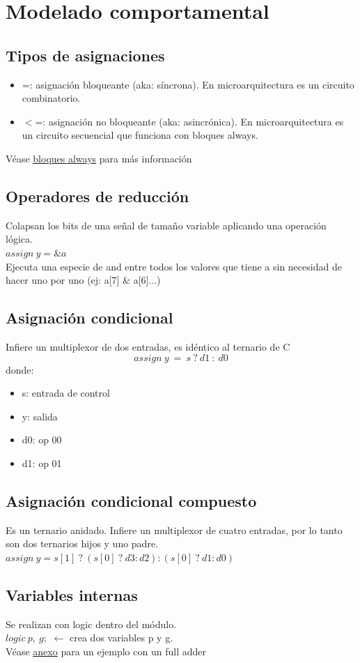 \documentclass[10pt,a4paper]{article}
\begin{document}
\section*{Modelado comportamental}
\subsection*{Tipos de asignaciones}
\begin{itemize}
    \item =: asignación bloqueante (aka: síncrona). En microarquitectura es un circuito combinatorio. 
    \item $<$=: asignación no bloqueante (aka: asincrónica). En microarquitectura es un circuito secuencial que funciona con bloques always. 
\end{itemize}
Véase \hyperref[subsec:bloques_always]{\underline{bloques always}} para más información
\subsection*{Operadores de reducción}
Colapsan los bits de una señal de tamaño variable aplicando una operación lógica. \\
$assign \ y = \&a$ \\
Ejecuta una especie de and entre todos los valores que tiene a sin necesidad de hacer uno por uno (ej: a[7] \& a[6]...) \\
\subsection*{Asignación condicional}
Infiere un multiplexor de dos entradas, es idéntico al ternario de C 
\[assign \ y \ = \ s \ ? \ d1 \ : \ d0\] 
donde:
\begin{itemize}
    \item s: entrada de control
    \item y: salida 
    \item d0: op 00 
    \item d1: op 01
\end{itemize}
\subsection*{Asignación condicional compuesto}
Es un ternario anidado. Infiere un multiplexor de cuatro entradas, por lo tanto son dos ternarios hijos y uno padre.
$ assign \ y = s[1] \ ? \ (s[0] \ ? \ d3 : d2) : (s[0] \ ? \ d1 : d0)$
\subsection*{Variables internas}
Se realizan con logic dentro del módulo. \\
$logic \ p, \ g;$ $ \leftarrow  $ crea dos variables p y g. \\
Véase \hyperref[subsec:SVL_FullAdder]{\underline{anexo}} para un ejemplo con un full adder
\end{document}
